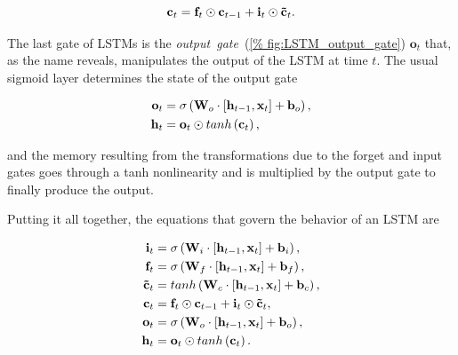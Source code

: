 \begin{equation}\label{eq:LSTM_state_update}
    \mathbf{c}_t = \mathbf{f}_t \odot \mathbf{c}_{t-1} +
        \mathbf{i}_t \odot \mathbf{\tilde c}_t.
\end{equation}

The last gate of LSTMs is the \emph{output~gate}~(\autoref{%
fig:LSTM_output_gate}) $\mathbf{o}_t$ that, as the name reveals, manipulates
the output of the LSTM at time $t$. The usual sigmoid layer determines the
state of the output gate

\begin{equation}\label{eq:LSTM_output_gate}
\begin{split}
    \mathbf{o}_t &= \sigma\left(\mathbf{W}_o \cdot \left[\mathbf{h}_{t-1},
        \mathbf{x}_t\right] + \mathbf{b}_o \right),\\
    \mathbf{h}_t &= \mathbf{o}_t \odot tanh \left(\mathbf{c}_t\right),
\end{split}
\end{equation}

\noindent and the memory resulting from the transformations due to the forget and
input gates goes through a tanh nonlinearity and is multiplied by the output
gate to finally produce the output.

Putting it all together, the equations that govern the behavior of an LSTM are

\begin{equation}\label{eq:LSTM}
\begin{split}
    \mathbf{i}_t &= \sigma\left(\mathbf{W}_i \cdot \left[\mathbf{h}_{t-1},
        \mathbf{x}_t\right] + \mathbf{b}_i \right),\\
    \mathbf{f}_t &= \sigma\left(\mathbf{W}_f \cdot \left[\mathbf{h}_{t-1},
        \mathbf{x}_t\right] + \mathbf{b}_f \right),\\
    \mathbf{\tilde c}_t &= tanh \left(\mathbf{W}_c \cdot
        \left[\mathbf{h}_{t-1}, \mathbf{x}_t\right] + \mathbf{b}_c \right),\\
    \mathbf{c}_t &= \mathbf{f}_t \odot \mathbf{c}_{t-1} + \mathbf{i}_t
        \odot \mathbf{\tilde c}_t,\\
    \mathbf{o}_t &= \sigma\left(\mathbf{W}_o \cdot \left[\mathbf{h}_{t-1},
        \mathbf{x}_t\right] + \mathbf{b}_o \right),\\
    \mathbf{h}_t &= \mathbf{o}_t \odot tanh \left(\mathbf{c}_t\right).
\end{split}
\end{equation}


